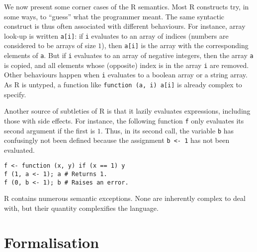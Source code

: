\documentclass[9pt, sigplan, natbib=false, screen=true]{acmart}
\newcommand\R{R}
\begin{document}
We now present some corner cases of the \R{} semantics.
Most \R{} constructs
try, in some ways, to ``guess'' what the programmer meant.
The same syntactic construct is thus often associated
with different behaviours.
For instance, array look-up is written \texttt{a[i]}:
if \texttt{i} evaluates to an array of indices
(numbers are considered to be arrays of size \(1\)),
then \texttt{a[i]} is the array with
the corresponding elements of \texttt{a}.
But if \texttt{i} evaluates to an array of negative integers,
then the array \texttt{a} is copied,
and all elements whose (opposite) index is in the array \texttt{i}
are removed.
Other behaviours happen when \texttt{i}
evaluates to a boolean array or a string array.
As \R{} is untyped,
a function like \texttt{function (a, i) a[i]}
is already complex to specify.

Another source of subtleties of \R{} is that it lazily evaluates expressions,
including those with side effects.
For instance, the following function \texttt{f}
only evaluates its second argument if the first is \(1\).
Thus, in its second call, the variable \texttt{b}
has confusingly not been defined because the assignment \texttt{b <- 1}
has not been evaluated.
\begin{verbatim}
f <- function (x, y) if (x == 1) y
f (1, a <- 1); a # Returns 1.
f (0, b <- 1); b # Raises an error.
\end{verbatim}

\R{} contains numerous semantic exceptions. %
None are inherently complex to deal with,
but their quantity complexifies the language.


\section{Formalisation}
\label{sec:formalisation}
\end{document}
